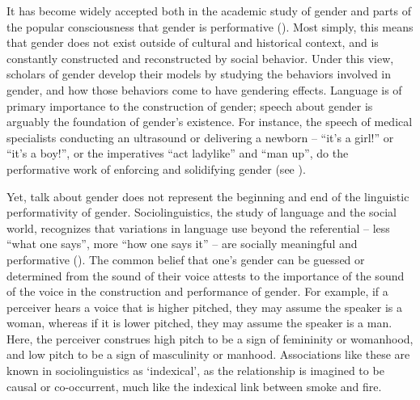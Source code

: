 \documentclass[12pt,twoside]{reedthesis}
\begin{document}
It has become widely accepted both in the academic study of gender and parts of the popular consciousness that gender is performative (\cite{butler_gender_1990, henry_performative_2025}). Most simply, this means that gender does not exist outside of cultural and historical context, and is constantly constructed and reconstructed by social behavior. Under this view, scholars of gender develop their models by studying the behaviors involved in gender, and how those behaviors come to have gendering effects. Language is of primary importance to the construction of gender; speech about gender is arguably the foundation of gender's existence. For instance, the speech of medical specialists conducting an ultrasound or delivering a newborn -- ``it's a girl!'' or ``it's a boy!'', or the imperatives ``act ladylike'' and ``man up'', do the performative work of enforcing and solidifying gender (see \cite{livia_queerly_1997}).

Yet, talk about gender does not represent the beginning and end of the linguistic performativity of gender. Sociolinguistics, the study of language and the social world, recognizes that variations in language use beyond the referential -- less ``what one says'', more ``how one says it'' -- are socially meaningful and performative (\cite{henry_performative_2025}). The common belief that one's gender can be guessed or determined from the sound of their voice attests to the importance of the sound of the voice in the construction and performance of gender. For example, if a perceiver hears a voice that is higher pitched, they may assume the speaker is a woman, whereas if it is lower pitched, they may assume the speaker is a man. Here, the perceiver construes high pitch to be a sign of femininity or womanhood, and low pitch to be a sign of masculinity or manhood. Associations like these are known in sociolinguistics as `indexical', as the relationship is imagined to be causal or co-occurrent, much like the indexical link between smoke and fire.
\end{document}
